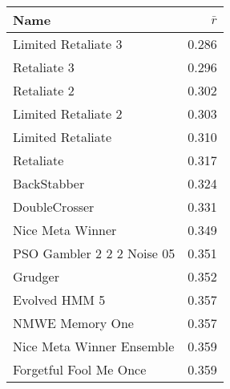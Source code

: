 \begin{tabular}{lr}
\toprule
Name                       &         \(\bar{r}\)\\
\midrule
Limited Retaliate 3        &            0.286 \\
Retaliate 3                &            0.296 \\
Retaliate 2                &            0.302 \\
Limited Retaliate 2        &            0.303 \\
Limited Retaliate          &            0.310 \\
Retaliate                  &            0.317 \\
BackStabber                &            0.324 \\
DoubleCrosser              &            0.331 \\
Nice Meta Winner           &            0.349 \\
PSO Gambler 2 2 2 Noise 05 &            0.351 \\
Grudger                    &            0.352 \\
Evolved HMM 5              &            0.357 \\
NMWE Memory One            &            0.357 \\
Nice Meta Winner Ensemble  &            0.359 \\
Forgetful Fool Me Once     &            0.359 \\
\bottomrule
\end{tabular}
